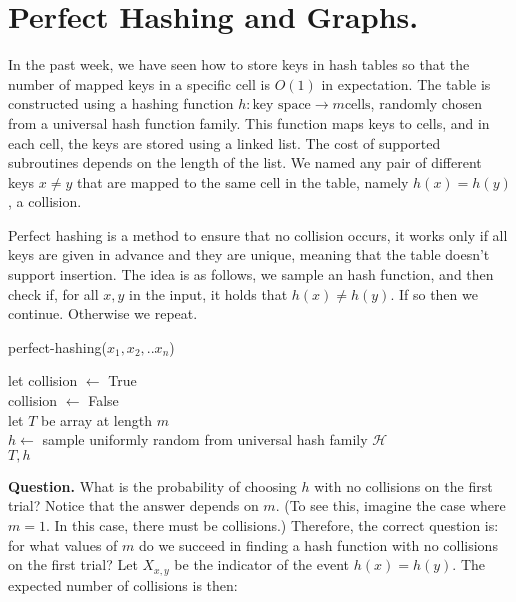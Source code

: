 

\newcommand{\image}{\text{ Im } }



\ifdefined\BOOK
\else
\setcounter{chapter}{8}
\fi

\chapter{Perfect Hashing and Graphs.}

In the past week, we have seen how to store keys in hash tables so that the number of mapped keys in a specific cell is $O(1)$ in expectation. The table is constructed using a hashing function $h : \text{key space} \rightarrow m \text{cells}$, randomly chosen from a universal hash function family. This function maps keys to cells, and in each cell, the keys are stored using a linked list. The cost of supported subroutines depends on the length of the list. We named any pair of different keys $x\neq y$ that are mapped to the same cell in the table, namely $h(x) = h(y)$, a collision.

Perfect hashing is a method to ensure that no collision occurs, it works only if all keys are given in advance and they are unique, meaning that the table doesn't support insertion. The idea is as follows, we sample an hash function, and then check if, for all $x,y$ in the input, it holds that $h(x)\neq h(y)$. If so then we continue. Otherwise we repeat. 

  \begin{algorithm}
  \caption{perfect-hashing($x_{1},x_{2},..x_{n}$)}
  let collision $\leftarrow$ True\\
   {
    collision $\leftarrow$ False\\
    let $T$ be array at length $m$ \\
    $h \leftarrow $ sample uniformly random from universal hash family $\mathcal{H}$\\
  }
  \Return $T,h$
  \end{algorithm}

  \textbf{Question.} What is the probability of choosing $h$ with no collisions on the first trial? Notice that the answer depends on $m$. (To see this, imagine the case where $m=1$. In this case, there must be collisions.) Therefore, the correct question is: for what values of $m$ do we succeed in finding a hash function with no collisions on the first trial? Let $X_{x,y}$ be the indicator of the event $h(x)=h(y)$. The expected number of collisions is then:


